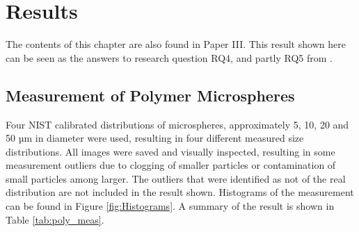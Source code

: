 
\chapter{Results}
\label{chap:results}

The contents of this chapter are also found in Paper III. This result shown here can be seen as the answers to research question RQ4, and partly RQ5 from .

\section{Measurement of Polymer Microspheres}

Four NIST calibrated distributions of microspheres, approximately 5, 10, 20 and 50 µm in diameter were used, resulting in four different measured size distributions. All images were saved and visually inspected, resulting in some measurement outliers due to clogging of smaller particles or contamination of small particles among larger. The outliers that were identified as not of the real distribution are not included in the result shown. Histograms of the measurement can be found in Figure \ref{fig:Histograms}. A summary of the result is shown in Table \ref{tab:poly_meas}.

